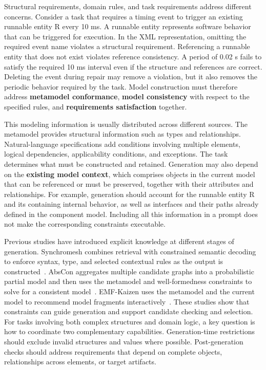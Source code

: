 \documentclass[pdflatex,iicol,sn-mathphys-num]{sn-jnl}
\newcommand{\paperref}[1]{~\citep{#1}}
\begin{document}
Structural requirements, domain rules, and task requirements address different concerns. Consider a task that requires a timing event to trigger an existing runnable entity R every 10 ms. A runnable entity represents software behavior that can be triggered for execution. In the XML representation, omitting the required event name violates a structural requirement. Referencing a runnable entity that does not exist violates reference consistency. A period of 0.02 s fails to satisfy the required 10 ms interval even if the structure and references are correct. Deleting the event during repair may remove a violation, but it also removes the periodic behavior required by the task. Model construction must therefore address \textbf{metamodel conformance}, \textbf{model consistency} with respect to the specified rules, and \textbf{requirements satisfaction} together.

This modeling information is usually distributed across different sources. The metamodel provides structural information such as types and relationships. Natural-language specifications add conditions involving multiple elements, logical dependencies, applicability conditions, and exceptions. The task determines what must be constructed and retained. Generation may also depend on the \textbf{existing model context}, which comprises objects in the current model that can be referenced or must be preserved, together with their attributes and relationships. For example, generation should account for the runnable entity R and its containing internal behavior, as well as interfaces and their paths already defined in the component model. Including all this information in a prompt does not make the corresponding constraints executable.

Previous studies have introduced explicit knowledge at different stages of generation. Synchromesh combines retrieval with constrained semantic decoding to enforce syntax, type, and selected contextual rules as the output is constructed\paperref{poesia2022synchromesh}. AbsCon aggregates multiple candidate graphs into a probabilistic partial model and then uses the metamodel and well-formedness constraints to solve for a consistent model\paperref{Chen_2025}. EMF-Kaizen uses the metamodel and the current model to recommend model fragments interactively\paperref{JOT:issue_2026_03/a8}. These studies show that constraints can guide generation and support candidate checking and selection. For tasks involving both complex structures and domain logic, a key question is how to coordinate two complementary capabilities. Generation-time restrictions should exclude invalid structures and values where possible. Post-generation checks should address requirements that depend on complete objects, relationships across elements, or target artifacts.
\end{document}
